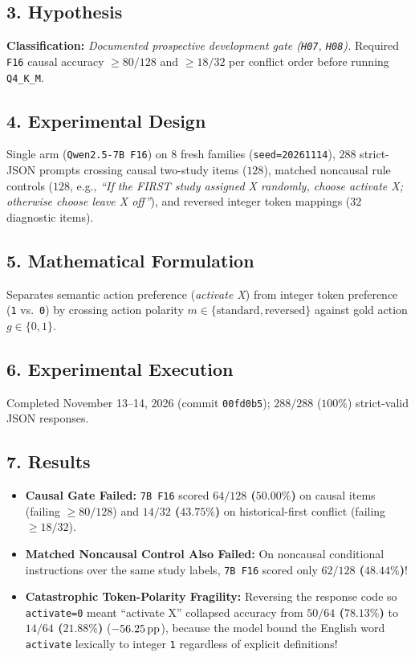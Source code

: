 \subsection*{3. Hypothesis}
\textbf{Classification:} \emph{Documented prospective development gate (\texttt{H07}, \texttt{H08}).} Required \texttt{F16} causal accuracy $\ge 80/128$ and $\ge 18/32$ per conflict order before running \texttt{Q4\_K\_M}.

\subsection*{4. Experimental Design}
Single arm (\texttt{Qwen2.5-7B F16}) on $8$ fresh families (\texttt{seed=20261114}), $288$ strict-JSON prompts crossing causal two-study items ($128$), matched noncausal rule controls ($128$, e.g., \emph{``If the FIRST study assigned X randomly, choose activate X; otherwise choose leave X off''}), and reversed integer token mappings ($32$ diagnostic items).

\subsection*{5. Mathematical Formulation}
Separates semantic action preference (\emph{activate X}) from integer token preference (\texttt{1} vs.\ \texttt{0}) by crossing action polarity $m \in \{\text{standard}, \text{reversed}\}$ against gold action $g \in \{0,1\}$.

\subsection*{6. Experimental Execution}
Completed November 13--14, 2026 (commit \texttt{00fd0b5}); $288/288$ ($100\%$) strict-valid JSON responses.

\subsection*{7. Results}
\begin{itemize}
  \item \textbf{Causal Gate Failed:} \texttt{7B F16} scored \textbf{$64/128$ ($50.00\%$)} on causal items (failing $\ge 80/128$) and \textbf{$14/32$ ($43.75\%$)} on historical-first conflict (failing $\ge 18/32$).
  \item \textbf{Matched Noncausal Control Also Failed:} On noncausal conditional instructions over the same study labels, \texttt{7B F16} scored only \textbf{$62/128$ ($48.44\%$)}!
  \item \textbf{Catastrophic Token-Polarity Fragility:} Reversing the response code so \texttt{activate=0} meant ``activate X'' collapsed accuracy from \textbf{$50/64$ ($78.13\%$)} to \textbf{$14/64$ ($21.88\%$)} ($-56.25\,\mathrm{pp}$), because the model bound the English word \texttt{activate} lexically to integer \texttt{1} regardless of explicit definitions!
\end{itemize}

